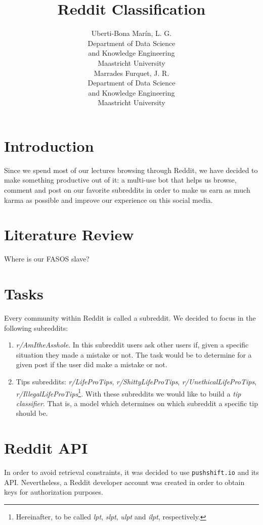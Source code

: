 \documentclass[11pt,a4paper]{article}
\title{Reddit Classification}
\author{Uberti-Bona Mar\'{i}n, L. G. \\
  Department of Data Science \\
  and Knowledge Engineering \\
  Maastricht University \\\And
  Marrades Furquet, J. R. \\
  Department of Data Science \\
  and Knowledge Engineering \\
  Maastricht University}
\date{}
\begin{document}
\maketitle

\section{Introduction}
\label{sec:introduction}
Since we spend most of our lectures browsing through Reddit, we have decided to make
something productive out of it: a multi-use bot that helps us browse, comment and post
on our favorite subreddits in order to make us earn as much karma as possible and
improve our experience on this social media.

\section{Literature Review}
\label{sec:literature_review}
Where is our FASOS slave?

\section{Tasks}
\label{sec:tasks}
Every community within Reddit is called a subreddit. We decided to focus in the
following subreddits:
\begin{enumerate}
	\item \textit{r/AmItheAsshole}. In this subreddit users ask other users if, given a
	specific situation they made a mistake or not. The task would be to determine for a
	given post if the user did make a mistake or not.
	\item Tips subreddits: \textit{r/LifeProTips}, \textit{r/ShittyLifeProTips},
	\textit{r/UnethicalLifeProTips}, \textit{r/IllegalLifeProTips}\footnote{Hereinafter, to be
	called \textit{lpt}, \textit{slpt}, \textit{ulpt} and \textit{ilpt}, respectively.}. With these
	subreddits we would like to build a \textit{tip classifier}. That is, a model which
	determines on which subreddit a specific tip should be. 
\end{enumerate}

\section{Reddit API}
\label{sec:reddit_api}
In order to avoid retrieval constraints, it was decided to use \texttt{pushshift.io} and its
API. Nevertheless, a Reddit developer account was created in order to obtain keys for
authorization purposes.\\
\end{document}
